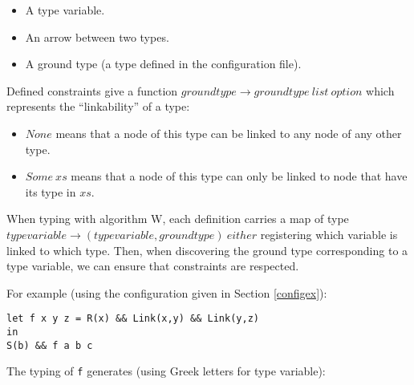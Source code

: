 \documentclass[10pt,a4paper]{article}
\newcommand{\ocaml}{\texttt}
\begin{document}
\begin{multicols}{2}
  \begin{itemize}
  \item A type variable.
  \item An arrow between two types.
  \item A ground type (a type defined in the configuration file).
  \end{itemize}
\end{multicols}

Defined constraints give a function $groundtype \to groundtype\ list\ option$ which represents the ``linkability'' of a type:
\begin{itemize}
\item $None$ means that a node of this type can be linked to any node of any other type.
\item $Some\ xs$ means that a node of this type can only be linked to node that have its type in $xs$.
\end{itemize}
When typing with algorithm W, each definition carries a map of type $typevariable \to (typevariable, groundtype)\ either$ registering which variable is linked to which type. Then, when discovering the ground type corresponding to a type variable, we can ensure that constraints are respected.

For example (using the configuration given in Section \ref{configex}):
\begin{verbatim}
let f x y z = R(x) && Link(x,y) && Link(y,z)
in
S(b) && f a b c
\end{verbatim}
The typing of \ocaml{f} generates (using Greek letters for type variable):\\

\begin{figure}[H]
  \centering
  \quad\quad
\end{figure}
\end{document}
